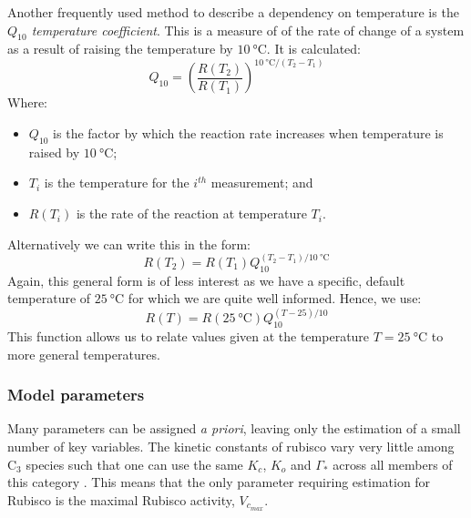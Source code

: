 \documentclass[11pt]{article} %
\begin{document}
Another frequently used method to describe a dependency on temperature is the \emph{$Q_{10}$ temperature coefficient}. This is a measure of of the rate of  change of a system as a result of raising the temperature by $\SI{10}{\celsius}$. It is calculated:
\begin{equation} \label{Q10_gen}
Q_{10} = \left ( \frac{R(T_2)}{R(T_1)} \right )^{\SI{10}{\celsius}/(T_2 - T_1)}
\end{equation}
Where:
\begin{itemize}
 \item $Q_{10}$ is the factor by which the reaction rate increases when temperature is raised by $\SI{10}{\celsius}$;
 \item $T_i$ is the temperature for the $i^{th}$ measurement; and
 \item $R(T_i)$ is the rate of the reaction at temperature $T_i$.
\end{itemize}
Alternatively we can write this in the form:
\begin{equation}
R(T_2) = R(T_1) Q_{10}^{(T_2 - T_1)/\SI{10}{\celsius}}
\end{equation}
Again, this general form is of less interest as we have a specific, default temperature of $\SI{25}{\celsius}$ for which we are quite well informed. Hence, we use:
\begin{equation} \label{Q10}
R(T) = R(\SI{25}{\celsius})Q_{10}^{(T-25)/10}
\end{equation}
This function allows us to relate values given at the temperature $T = \SI{25}{\celsius}$ to more general temperatures.

\subsubsection{Model parameters}
Many parameters can be assigned \emph{a priori}, leaving only the estimation of a small number of key variables. The kinetic constants of rubisco vary very little among C$_3$ species such that one can use the same $K_c$, $K_o$ and $\Gamma_*$ across all members of this category \cite{CaemmererBiochemicalmodelsleaf2000}. This means that the only parameter requiring estimation for Rubisco is the maximal Rubisco activity, $V_{c_{max}}$. 
\end{document}
